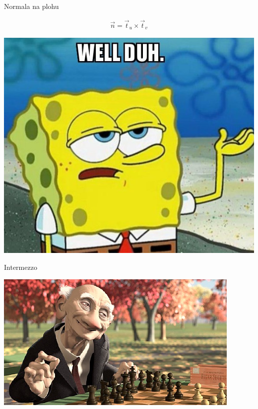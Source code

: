 \documentclass[9pt]{beamer}
\begin{document}
\begin{frame}{Normala na plohu}
	\begin{block}{}
		\begin{align*}
		\vec{n} = \vec{t}_u \times \vec{t}_v
		\end{align*}
	\end{block}
	
	\begin{center}
		\includegraphics[height=4.cm]{./slike/well-duh.jpg}
	\end{center}
\end{frame}	
\begin{frame}{Intermezzo}
	\begin{center}
		\includegraphics[height=3.cm]{./slike/stari_covjek.png}
	\end{center}
\end{frame}
\end{document}
